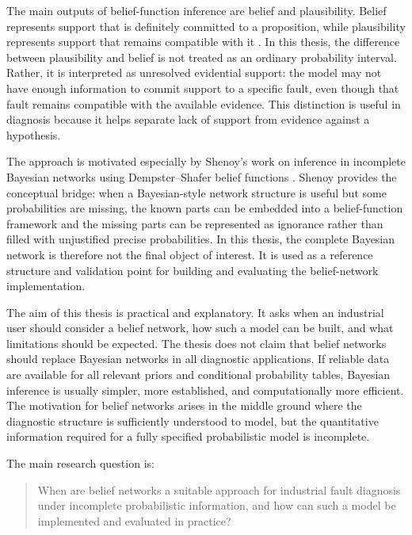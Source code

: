 \documentclass[runningheads]{llncs}
\begin{document}
The main outputs of belief-function inference are belief and plausibility. Belief represents support that is definitely committed to a proposition, while plausibility represents support that remains compatible with it \cite{Shafer1976,SmetsKennes1994}. In this thesis, the difference between plausibility and belief is not treated as an ordinary probability interval. Rather, it is interpreted as unresolved evidential support: the model may not have enough information to commit support to a specific fault, even though that fault remains compatible with the available evidence. This distinction is useful in diagnosis because it helps separate lack of support from evidence against a hypothesis.

The approach is motivated especially by Shenoy's work on inference in incomplete Bayesian networks using Dempster--Shafer belief functions \cite{Shenoy2023IncompleteBN}. Shenoy provides the conceptual bridge: when a Bayesian-style network structure is useful but some probabilities are missing, the known parts can be embedded into a belief-function framework and the missing parts can be represented as ignorance rather than filled with unjustified precise probabilities. In this thesis, the complete Bayesian network is therefore not the final object of interest. It is used as a reference structure and validation point for building and evaluating the belief-network implementation.

The aim of this thesis is practical and explanatory. It asks when an industrial user should consider a belief network, how such a model can be built, and what limitations should be expected. The thesis does not claim that belief networks should replace Bayesian networks in all diagnostic applications. If reliable data are available for all relevant priors and conditional probability tables, Bayesian inference is usually simpler, more established, and computationally more efficient. The motivation for belief networks arises in the middle ground where the diagnostic structure is sufficiently understood to model, but the quantitative information required for a fully specified probabilistic model is incomplete.

The main research question is:

\begin{quote}
When are belief networks a suitable approach for industrial fault diagnosis under incomplete probabilistic information, and how can such a model be implemented and evaluated in practice?
\end{quote}
\end{document}
